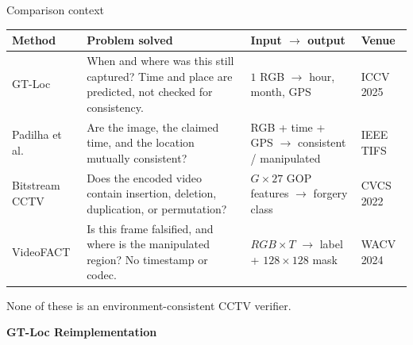 \documentclass[aspectratio=169,11pt]{beamer}
\begin{document}
\begin{frame}{Comparison context}
\footnotesize
\renewcommand{\arraystretch}{1.22}
\setlength{\tabcolsep}{4pt}
\begin{tabular}{@{}>{\raggedright\arraybackslash}p{1.9cm}
                >{\raggedright\arraybackslash}p{5.85cm}
                >{\raggedright\arraybackslash}p{3.35cm}
                >{\raggedright\arraybackslash}p{1.75cm}@{}}
\toprule
\textbf{Method} & \textbf{Problem solved} & \textbf{Input $\rightarrow$ output} & \textbf{Venue} \\
\midrule
GT-Loc &
When and where was this still captured? Time and place are predicted, not checked for consistency. &
$1$ RGB $\rightarrow$ hour, month, GPS &
ICCV 2025 \\
Padilha et al. &
Are the image, the claimed time, and the location mutually consistent? &
RGB + time + GPS $\rightarrow$ consistent / manipulated &
IEEE TIFS \\
Bitstream CCTV &
Does the encoded video contain insertion, deletion, duplication, or permutation? &
$G\times 27$ GOP features $\rightarrow$ forgery class &
CVCS 2022 \\
VideoFACT &
Is this frame falsified, and where is the manipulated region? No timestamp or codec. &
$RGB\times T$ $\rightarrow$ label + $128\times128$ mask &
WACV 2024 \\
\bottomrule
\end{tabular}
\vspace{0.6em}
\normalsize
\parbox{\textwidth}{\raggedright None of these is an environment-consistent CCTV verifier.}
\end{frame}

\begin{frame}[plain]
\begin{center}
\vspace{2.4cm}
{\color{aiia}\Huge\bfseries GT-Loc Reimplementation}
\end{center}
\end{frame}
\end{document}
